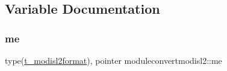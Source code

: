 \subsection{Variable Documentation}
\mbox{\label{namespacemoduleconvertmodisl2_a679fc9516492ddf5d2745fc5ee6aa00f}} 
\subsubsection{\texorpdfstring{me}{me}}
{\footnotesize\ttfamily type(\mbox{\hyperlink{structmoduleconvertmodisl2_1_1t__modisl2format}{t\+\_\+modisl2format}}), pointer moduleconvertmodisl2\+::me\hspace{0.3cm}{\ttfamily [private]}}

